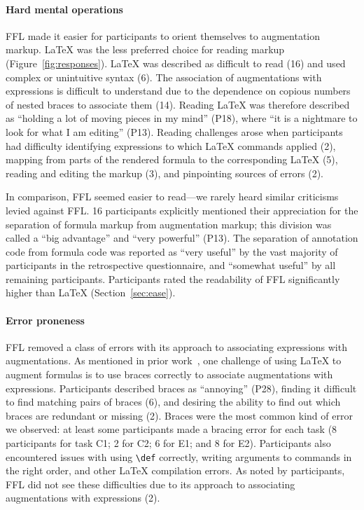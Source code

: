 \paragraph{Hard mental operations}

FFL made it easier for participants to orient themselves to augmentation markup. LaTeX was the less preferred choice for reading markup (Figure~\ref{fig:responses}). LaTeX was described as difficult to read (16) and used complex or unintuitive syntax (6). The association of augmentations with expressions is difficult to understand due to the dependence on copious numbers of nested braces to associate them (14). Reading LaTeX was therefore described as ``holding a lot of moving pieces in my mind'' (P18), where ``it is a nightmare to look for what I am editing'' (P13). Reading challenges arose when participants had difficulty identifying expressions to which LaTeX commands applied (2), mapping from parts of the rendered formula to the corresponding LaTeX (5), reading and editing the markup (3), and pinpointing sources of errors (2).

In comparison, FFL seemed easier to read---we rarely heard similar criticisms levied against FFL. 16 participants explicitly mentioned their appreciation for the separation of formula markup from augmentation markup; this division was called a ``big advantage'' and ``very powerful'' (P13). The separation of annotation code from formula code was reported as ``very useful'' by the vast majority of participants in the retrospective questionnaire, and ``somewhat useful'' by all remaining participants. Participants rated the readability of FFL significantly higher than LaTeX (Section~\ref{sec:ease}).

\paragraph{Error proneness}

FFL removed a class of errors with its approach to associating expressions with augmentations. As mentioned in prior work~\cite{ref:head2022math}, one challenge of using LaTeX to augment formulas is to use braces correctly to associate augmentations with expressions. Participants described braces as ``annoying'' (P28), finding it difficult to find matching pairs of braces (6), and desiring the ability to find out which braces are redundant or missing (2). Braces were the most common kind of error we observed: at least some participants made a bracing error for each task (8 participants for task C1; 2 for C2; 6 for E1; and 8 for E2). Participants also encountered issues with using \texttt{\textbackslash{}def} correctly, writing arguments to commands in the right order, and other LaTeX compilation errors. As noted by participants, FFL did not see these difficulties due to its approach to associating augmentations with expressions (2).

